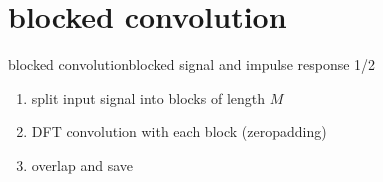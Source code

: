 \section[blocked]{blocked convolution}
	\begin{frame}{blocked convolution}{blocked signal and impulse response 1/2}
		\begin{enumerate}
			\item	split input signal into blocks of length $M$
			\item	DFT convolution with each block (zeropadding)
			\item	overlap and save
		\end{enumerate}
\end{frame}
